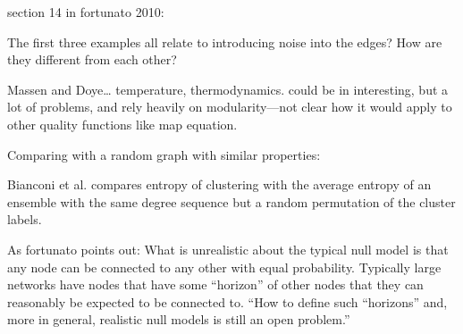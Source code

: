 section 14 in fortunato 2010:

The first three examples all relate to introducing noise into the edges?
How are they different from each other?

Massen and Doye\ldots{} temperature, thermodynamics. could be in
interesting, but a lot of problems, and rely heavily on modularity---not
clear how it would apply to other quality functions like map equation.

Comparing with a random graph with similar properties:

Bianconi et al. compares entropy of clustering with the average entropy
of an ensemble with the same degree sequence but a random permutation of
the cluster labels.

As fortunato points out: What is unrealistic about the typical null
model is that any node can be connected to any other with equal
probability. Typically large networks have nodes that have some
``horizon'' of other nodes that they can reasonably be expected to be
connected to. ``How to define such ``horizons'' and, more in general,
realistic null models is still an open problem.''
